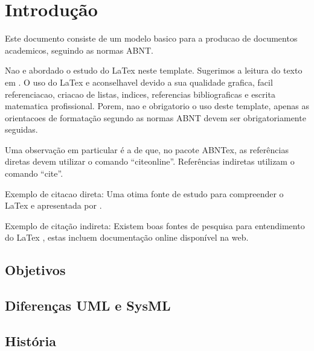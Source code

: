 \chapter{Introdução}\label{CAP:introducao}

Este documento consiste de um modelo basico para a producao de documentos academicos, seguindo as normas ABNT. 

Nao e abordado o estudo do LaTex neste template. Sugerimos a leitura do texto em . O uso do LaTex e aconselhavel devido a sua qualidade grafica, facil referenciacao, criacao de listas, indices, referencias bibliograficas e escrita matematica profissional. Porem, nao e obrigatorio o uso deste template, apenas as orientacoes de formatação segundo as normas ABNT devem ser obrigatoriamente seguidas.

Uma observação em particular é a de que, no pacote ABNTex, as referências diretas devem utilizar o comando ``citeonline''. Referências indiretas utilizam o comando ``cite''.

Exemplo de citacao direta: Uma otima fonte de estudo para compreender o LaTex e apresentada por . 

Exemplo de citação indireta: Existem boas fontes de pesquisa para entendimento do LaTex \cite{Oetiker:1995}, estas incluem documentação online disponível na web.

\section{Objetivos}


 
\section{Diferenças UML e SysML}






\section{História}

